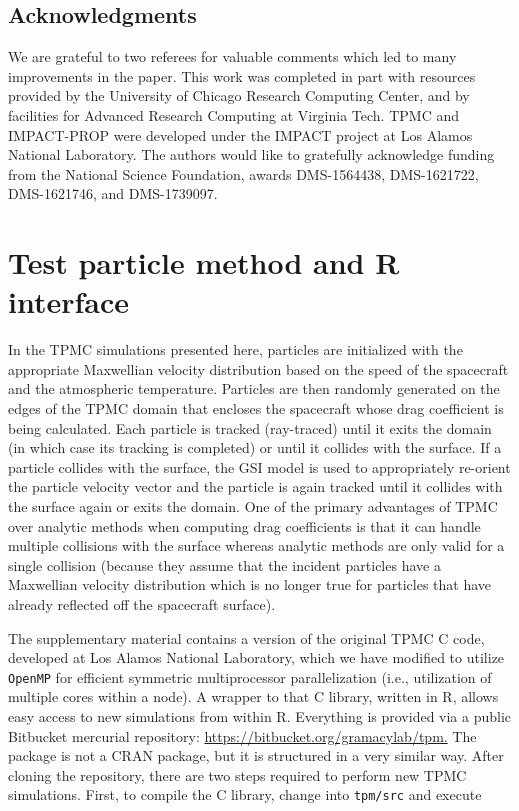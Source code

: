\documentclass[12pt]{article}
\begin{document}
\subsection*{Acknowledgments}

We are grateful to two referees for valuable comments which led to many
improvements in the paper. This work was completed in part with
resources provided by the University of Chicago Research Computing Center, and
by facilities for Advanced Research Computing at Virginia Tech.  TPMC and
IMPACT-PROP were developed under the IMPACT project at Los Alamos National
Laboratory.  The authors would like to gratefully acknowledge funding from the
National Science Foundation, awards DMS-1564438, DMS-1621722, DMS-1621746, and
DMS-1739097.

\appendix

\bigskip

\section{Test particle method and {\sf R} interface}
\label{sec:tpm}

In the TPMC simulations presented here, particles are initialized with the 
appropriate Maxwellian velocity distribution based on the speed of the 
spacecraft and the atmospheric temperature.  Particles are then randomly 
generated on the edges of the TPMC domain that encloses the spacecraft 
whose drag coefficient is being calculated.  Each particle is tracked (ray-traced) 
until it exits the domain (in which case its tracking is completed) or until it 
collides with the surface.  If a particle collides with the surface, the GSI model 
is used to appropriately re-orient the particle velocity vector and the particle is 
again tracked until it collides with the surface again or exits the domain.  One of 
the primary advantages of TPMC over analytic methods when computing drag 
coefficients is that it can handle multiple collisions with the surface whereas 
analytic methods are only valid for a single collision (because they assume 
that the incident particles have a Maxwellian velocity distribution which is no 
longer true for particles that have already reflected off the spacecraft surface).

The supplementary material contains a version of the original TPMC {\sf C}
code, developed at Los Alamos National Laboratory, which we have modified to
utilize {\tt OpenMP} for efficient symmetric multiprocessor parallelization
(i.e., utilization of multiple cores within a node).  A wrapper to that {\sf
C} library, written in {\sf R}, allows easy access to new simulations from
within {\sf R}. Everything is provided via a public Bitbucket mercurial
repository: \url{https://bitbucket.org/gramacylab/tpm.} The package
is not a CRAN package, but it is structured in a very similar way. After
cloning the repository, there are two steps
required to perform new TPMC simulations. First, to compile the {\sf C}
library, change into \verb!tpm/src! and execute
\end{document}
